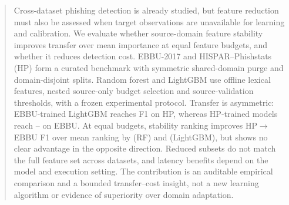 \begin{abstract}
Cross-dataset phishing detection is already studied, but feature reduction must also be assessed when target observations are unavailable for learning and calibration. We evaluate whether source-domain feature stability improves transfer over mean importance at equal feature budgets, and whether it reduces detection cost. EBBU-2017 and HISPAR--Phishstats (HP) form a curated benchmark with symmetric shared-domain purge and domain-disjoint splits. Random forest and LightGBM use offline lexical features, nested source-only budget selection and source-validation thresholds, with a frozen experimental protocol. Transfer is asymmetric: EBBU-trained LightGBM reaches F1  on HP, whereas HP-trained models reach -- on EBBU. At equal budgets, stability ranking improves HP$\rightarrow$EBBU F1 over mean ranking by  (RF) and  (LightGBM), but shows no clear advantage in the opposite direction. Reduced subsets do not match the full feature set across datasets, and latency benefits depend on the model and execution setting. The contribution is an auditable empirical comparison and a bounded transfer--cost insight, not a new learning algorithm or evidence of superiority over domain adaptation.
\end{abstract}
